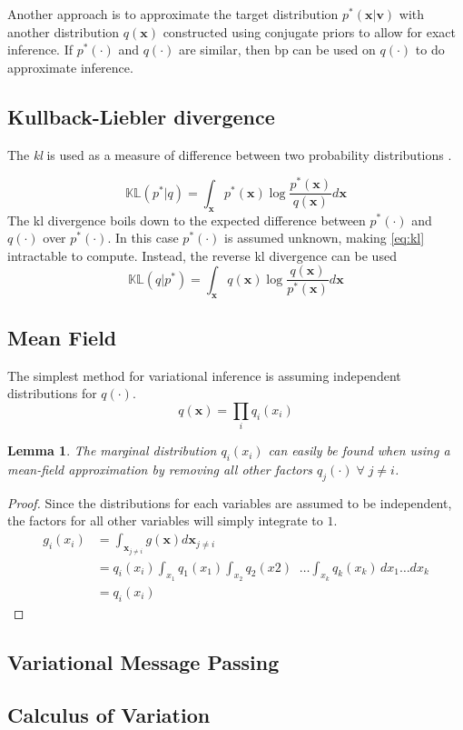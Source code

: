 Another approach is to approximate the target distribution $p^*(\mathbf{x} | \mathbf{v})$ with another distribution $q(\mathbf{x})$ constructed using conjugate priors to allow for exact inference. If $p^*(\cdot)$ and $q(\cdot)$ are similar, then \acrshort{bp} can be used on $q(\cdot)$ to do approximate inference.

\subsection{Kullback-Liebler divergence}
The \textit{\acrfull{kl}}  is used as a measure of difference between two probability distributions \cite{kullback1951,murphy}.

\begin{equation}\label{eq:kl}
    \mathbb{KL}(p^* | q) = \int_\mathbf{x} p^*(\mathbf{x}) \log \frac{p^*(\mathbf{x})}{q(\mathbf{x})} d\mathbf{x}
\end{equation}
The \acrshort{kl} divergence boils down to the expected difference between $p^*(\cdot)$ and $q(\cdot)$ over $p^*(\cdot)$.
In this case $p^*(\cdot)$ is assumed unknown, making \cref{eq:kl} intractable to compute. Instead, the reverse \acrshort{kl} divergence can be used 
\begin{equation}\label{eq:reverse_kl}
    \mathbb{KL}(q | p^*) = \int_\mathbf{x} q(\mathbf{x}) \log \frac{q(\mathbf{x})}{p^*(\mathbf{x})} d\mathbf{x}
\end{equation}

\subsection{Mean Field}
The simplest method for variational inference is assuming independent distributions for $q(\cdot)$.
\begin{equation}
    q(\mathbf{x}) = \prod_i q_i(x_i)
\end{equation}

\newtheorem{meanfield}{Lemma}[section]
\begin{meanfield}
The marginal distribution $q_i(x_i)$ can easily be found when using a mean-field approximation by removing all other factors $q_{j}(\cdot) \; \forall \; j \neq i$.
\end{meanfield}

\begin{proof}
    Since the distributions for each variables are assumed to be independent, the factors for all other variables will simply integrate to $1$. 
    \begin{subequations}
    \begin{align}
        g_i(x_i) &= \int_{\mathbf{x}_{j \neq i}} g(\mathbf{x}) d\mathbf{x}_{j \neq i}\\ 
        &= q_i(x_i) \int_{x_1} q_1(x_1)\int_{x_2}q_2(x2) \; \;  \dots \int_{x_k} q_k(x_k) \, dx_1 \dots dx_k\\ 
        &= q_i(x_i)
    \end{align}
    \end{subequations}
\end{proof}


\subsection{Variational Message Passing}



\subsection{Calculus of Variation}